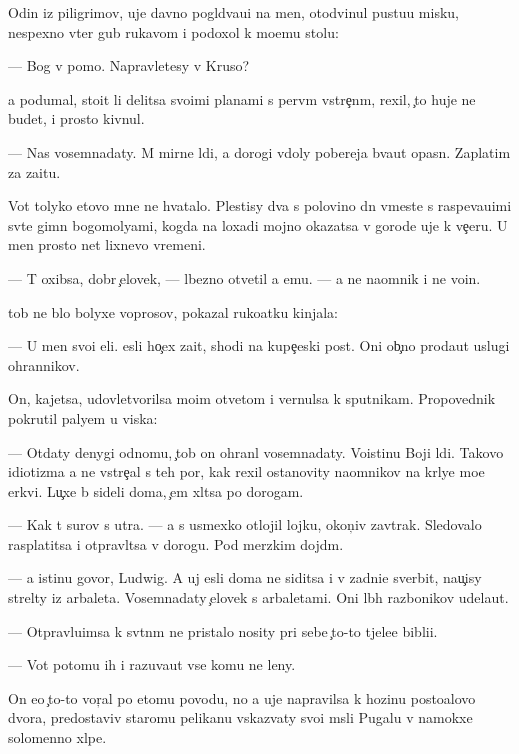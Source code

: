 \documentclass[10pt]{book}
\begin{document}
Odin iz piligrimov, uje davno pogl{\ia}d{\yi}va{\y}u{\x}i{\y} na men{\ia}, otodvinul pustu{\y}u misku, nespexno v{\yi}ter gub{\yi} rukavom i podoxol k mo{\y}emu stolu:

— Bog v pomo{\x}. Napravl{\ia}{\y}etesy v Kruso?

{\Y}a podumal, sto{\y}it li delitsa svo{\y}imi planami s perv{\yi}m vstre{\c}n{\yi}m, rexil, {\c}to huje ne budet, i prosto kivnul.

— Nas vosemnad{\q}aty. M{\yi} mirn{\yi}{\y}e l{\iu}di, a dorogi vdoly poberej{\y}a b{\yi}va{\y}ut opasn{\yi}. Zaplatim za za{\x}itu.

Vot tolyko etovo mne ne hvatalo. Plestisy dva s polovino{\y} dn{\ia} vmeste s raspeva{\y}u{\x}imi sv{\ia}t{\yi}{\y}e gimn{\yi} bogomoly{\q}ami, kogda na loxadi mojno okazatsa v gorode uje k ve{\c}eru. U men{\ia} prosto net lixnevo vremeni.

— T{\yi} oxibsa, dobr{\yi}{\y} {\c}elovek, — l{\iu}bezno otvetil {\y}a {\y}emu. — {\Y}a ne na{\y}omnik i ne vo{\y}in.

{\C}tob{\yi} ne b{\yi}lo bolyxe voprosov, pokazal ruko{\y}atku kinjala:

— U men{\ia} svo{\y}i {\q}eli. {\Y}esli ho{\c}ex za{\x}it{\yi}, shodi na kupe{\c}eski{\y} post. Oni ob{\yi}{\c}no proda{\y}ut uslugi ohrannikov.

On, kajetsa, udovletvorilsa mo{\y}im otvetom i vernulsa k sputnikam. Propovednik pokrutil paly{\q}em u viska:

— Otdaty denygi odnomu, {\c}tob{\yi} on ohran{\ia}l vosemnad{\q}aty. Voistinu Boj{\yf}i l{\iu}di. Takovo idiotizma {\y}a ne vstre{\c}al s teh por, kak rexil ostanovity na{\y}omnikov na kr{\yi}ly{\q}e mo{\y}e{\y} {\q}erkvi. Lu{\c}xe b{\yi} sideli doma, {\c}em xl{\ia}tsa po dorogam.

— Kak t{\yi} surov s utra. — {\Y}a s usmexko{\y} otlojil lojku, okon{\c}iv zavtrak. Sledovalo rasplatitsa i otpravl{\ia}tsa v dorogu. Pod merzkim dojd{\e}m.

— {\Y}a istinu govor{\iu}, Ludwig. A uj {\y}esli doma ne siditsa i v zadni{\q}e sverbit, nau{\c}isy strel{\ia}ty iz arbaleta. Vosemnad{\q}aty {\c}elovek s arbaletami. Oni l{\iu}b{\yi}h razbo{\y}nikov udela{\y}ut.

— Otpravl{\ia}{\y}u{\x}imsa k sv{\ia}t{\yi}n{\ia}m ne pristalo nosity pri sebe {\c}to-to t{\ia}jele{\y}e bibli{\y}i.

— Vot potomu ih i razuva{\y}ut vse komu ne leny.

On {\y}e{\x}o {\c}to-to vor{\c}al po etomu povodu, no {\y}a uje napravilsa k hoz{\ia}{\y}inu posto{\y}alovo dvora, predostaviv staromu pelikanu v{\yi}skaz{\yi}vaty svo{\y}i m{\yi}sli Pugalu v namokxe{\y} solomenno{\y} xl{\ia}pe.
\end{document}
